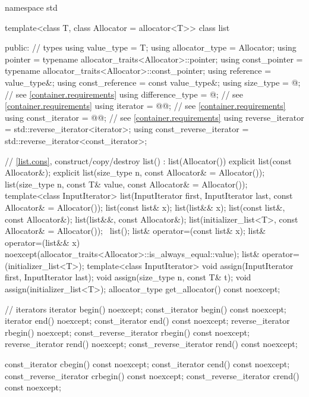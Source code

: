 \begin{codeblock}
namespace std {
  template<class T, class Allocator = allocator<T>>
  class list {
  public:
    // types
    using value_type             = T;
    using allocator_type         = Allocator;
    using pointer                = typename allocator_traits<Allocator>::pointer;
    using const_pointer          = typename allocator_traits<Allocator>::const_pointer;
    using reference              = value_type&;
    using const_reference        = const value_type&;
    using size_type              = @\impdef@; // see \ref{container.requirements}
    using difference_type        = @\impdef@; // see \ref{container.requirements}
    using iterator               = @@; // see \ref{container.requirements}
    using const_iterator         = @@; // see \ref{container.requirements}
    using reverse_iterator       = std::reverse_iterator<iterator>;
    using const_reverse_iterator = std::reverse_iterator<const_iterator>;

    // \ref{list.cons}, construct/copy/destroy
    list() : list(Allocator()) { }
    explicit list(const Allocator&);
    explicit list(size_type n, const Allocator& = Allocator());
    list(size_type n, const T& value, const Allocator& = Allocator());
    template<class InputIterator>
      list(InputIterator first, InputIterator last, const Allocator& = Allocator());
    list(const list& x);
    list(list&& x);
    list(const list&, const Allocator&);
    list(list&&, const Allocator&);
    list(initializer_list<T>, const Allocator& = Allocator());
    ~list();
    list& operator=(const list& x);
    list& operator=(list&& x)
      noexcept(allocator_traits<Allocator>::is_always_equal::value);
    list& operator=(initializer_list<T>);
    template<class InputIterator>
      void assign(InputIterator first, InputIterator last);
    void assign(size_type n, const T& t);
    void assign(initializer_list<T>);
    allocator_type get_allocator() const noexcept;

    // iterators
    iterator               begin() noexcept;
    const_iterator         begin() const noexcept;
    iterator               end() noexcept;
    const_iterator         end() const noexcept;
    reverse_iterator       rbegin() noexcept;
    const_reverse_iterator rbegin() const noexcept;
    reverse_iterator       rend() noexcept;
    const_reverse_iterator rend() const noexcept;

    const_iterator         cbegin() const noexcept;
    const_iterator         cend() const noexcept;
    const_reverse_iterator crbegin() const noexcept;
    const_reverse_iterator crend() const noexcept;

}}
\end{codeblock}
